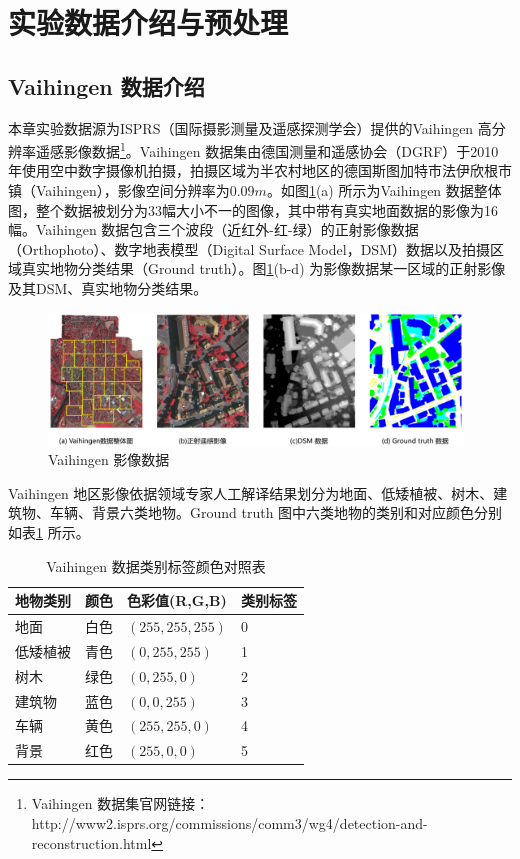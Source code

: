 \section{实验数据介绍与预处理}
\label{sec:second}

\subsection{Vaihingen 数据介绍}
\label{sec:second-1}
本章实验数据源为ISPRS（国际摄影测量及遥感探测学会）提供的Vaihingen 高分辨率遥感影像数据\footnote{Vaihingen 数据集官网链接：http://www2.isprs.org/commissions/comm3/wg4/detection-and-reconstruction.html}。Vaihingen 数据集由德国测量和遥感协会（DGRF）于2010年使用空中数字摄像机拍摄，拍摄区域为半农村地区的德国斯图加特市法伊欣根市镇（Vaihingen），影像空间分辨率为$0.09m$。如图\ref{fig:vaihingen}(a) 所示为Vaihingen 数据整体图，整个数据被划分为33幅大小不一的图像，其中带有真实地面数据的影像为16幅。Vaihingen 数据包含三个波段（近红外-红-绿）的正射影像数据（Orthophoto）、数字地表模型（Digital Surface Model，DSM）数据以及拍摄区域真实地物分类结果（Ground truth）。图\ref{fig:vaihingen}(b-d) 为影像数据某一区域的正射影像及其DSM、真实地物分类结果。

\begin{figure}[htb]
  \centering
  \includegraphics[width=0.98\textwidth]{figures/vaihingen2}
  \caption{Vaihingen 影像数据}\label{fig:vaihingen}
\end{figure}

Vaihingen 地区影像依据领域专家人工解译结果划分为地面、低矮植被、树木、建筑物、车辆、背景六类地物。Ground truth 图中六类地物的类别和对应颜色分别如表\ref{tab:vaih_gt} 所示。

\begin{table}[htbp]
  \caption{Vaihingen 数据类别标签颜色对照表}\label{tab:vaih_gt}
  \centering
  \footnotesize

  \begin{tabular}{p{2cm}p{2cm}p{3cm}p{2cm}}
    \toprule
    地物类别 & 颜色 & 色彩值(R,G,B)   & 类别标签 \\
    \midrule
    地面     & 白色 & $(255,255,255)$ & 0        \\
    低矮植被 & 青色 & $(0,255,255)$   & 1        \\
    树木     & 绿色 & $(0,255,0)$     & 2        \\
    建筑物   & 蓝色 & $(0,0,255) $    & 3        \\
    车辆     & 黄色 & $(255,255,0)$   & 4        \\
    背景     & 红色 & $(255,0,0) $    & 5        \\
    \bottomrule
  \end{tabular}
\end{table}

